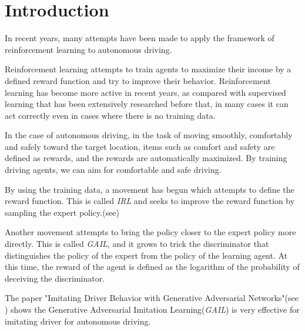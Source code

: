 \chapter{Introduction}

In recent years, many attempts have been made to apply the framework of reinforcement learning to autonomous driving.



Reinforcement learning attempts to train agents to maximize their income by a defined reward function and try to improve their behavior.
Reinforcement learning has become more active in recent years, as compared with supervised learning that has been extensively researched before that, in many cases it can act correctly even in cases where there is no training data.

In the case of autonomous driving, in the task of moving smoothly, comfortably and safely toward the target location, items such as comfort and safety are defined as rewards, and the rewards are automatically maximized. By training driving agents, we can aim for comfortable and safe driving.

By using the training data, a movement has begun which attempts to define the reward function. This is called {\it IRL} and seeks to improve the reward function by sampling the expert policy.(see\cite{kuderer2015learning})

Another movement attempts to bring the policy closer to the expert policy more directly. This is called {\it GAIL}, and it grows to trick the discriminator that distinguishes the policy of the expert from the policy of the learning agent.
At this time, the reward of the agent is defined as the logarithm of the probability of deceiving the discriminator.

The paper "Imitating Driver Behavior with Generative Adversarial Networks"(see \cite{DBLP:journals/corr/KueflerMWK17}) shows  
the Generative Adversarial Imitation Learning({\it GAIL}) is very effective for imitating driver for autonomous driving.

